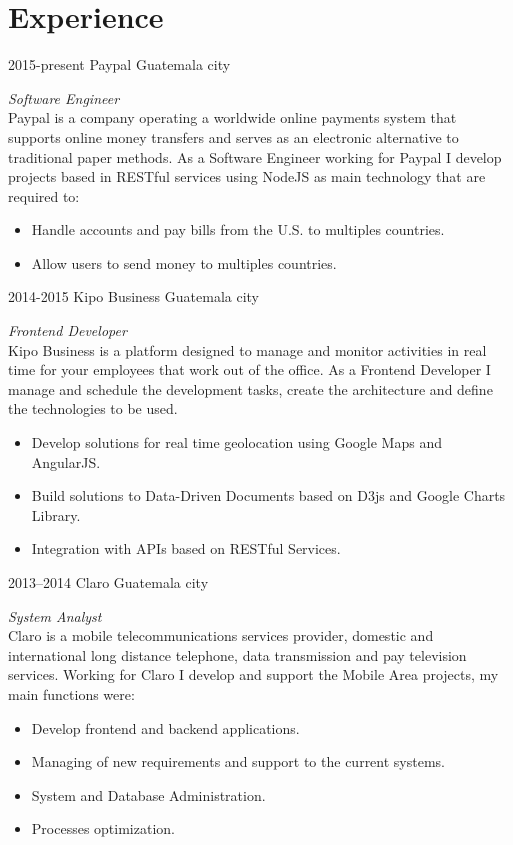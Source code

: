 \documentclass[]{friggeri-cv} %
\begin{document}
\section{Experience}
\begin{entrylist}
\entry
	{2015-present}
	{Paypal}
	{Guatemala city}
	{
		\emph{Software Engineer} \\
		Paypal is a company operating a worldwide online payments system that supports online money transfers
		and serves as an electronic alternative to traditional paper methods. As a Software Engineer working for
		Paypal I develop projects based in RESTful services using NodeJS as main technology that are required to:

		\begin{itemize}
			\item Handle accounts and pay bills from the U.S. to multiples countries.
			\item Allow users to send money to multiples countries.
		\end{itemize}
	}

\entry
	{2014-2015}
	{Kipo Business}
	{Guatemala city}
	{
		\emph{Frontend Developer} \\
		Kipo Business is a platform designed to manage and monitor activities in real time for your employees that
		work out of the office. As a Frontend Developer I manage and schedule the development tasks, create the 
		architecture and define the technologies to be used.

		\begin{itemize}
			\item Develop solutions for real time geolocation using Google Maps and AngularJS.
			\item Build solutions to Data-Driven Documents based on D3js and Google Charts Library.
			\item Integration with APIs based on RESTful Services.
		\end{itemize}
	}
	
\entry
	{2013--2014}
	{Claro}
	{Guatemala city}
	{
		\emph{System Analyst} \\
		Claro is a mobile telecommunications services provider, domestic and international
		long distance telephone, data transmission and pay television services. Working for Claro I develop and support 
		the Mobile Area projects, my main functions were:

		\begin{itemize}
			\item Develop frontend and backend applications.
			\item Managing of new requirements and support to the current systems.
			\item System and Database Administration.
			\item Processes optimization.
		\end{itemize}
	}

\end{entrylist}
\end{document}
